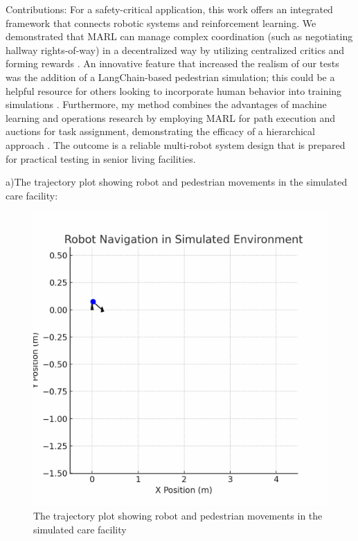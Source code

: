\documentclass[conference]{IEEEtran}
\begin{document}
Contributions: For a safety-critical application, this work offers an integrated framework that connects robotic systems and reinforcement learning. We demonstrated that MARL can manage complex coordination (such as negotiating hallway rights-of-way) in a decentralized way by utilizing centralized critics and forming rewards \citep{wang2023a}. An innovative feature that increased the realism of our tests was the addition of a LangChain-based pedestrian simulation; this could be a helpful resource for others looking to incorporate human behavior into training simulations \citep{yang2022, rostumi2019}. Furthermore, my method combines the advantages of machine learning and operations research by employing MARL for path execution and auctions for task assignment, demonstrating the efficacy of a hierarchical approach \citep{kayy2017, gerkey2023}. The outcome is a reliable multi-robot system design that is prepared for practical testing in senior living facilities.


a)The trajectory plot showing robot and pedestrian movements in the simulated care facility: 
\begin{figure}
    \centering
    \includegraphics[width=1\linewidth]{image.png}
    \caption{The trajectory plot showing robot and pedestrian movements in the simulated care facility }
    \label{fig:placeholder}
\end{figure}
\end{document}
